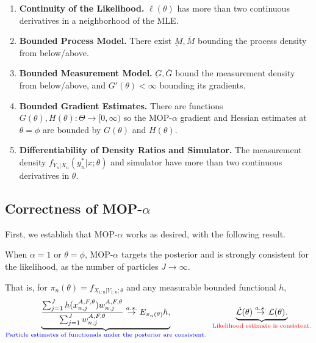 \documentclass{article}
\begin{document}
\begin{enumerate}[label=(A\arabic*)]
    \item \textbf{Continuity of the Likelihood.} $\ell(\theta)$ has more than two continuous derivatives in a neighborhood of the MLE.
    \label{assump:conti-lik}
    \item \textbf{Bounded Process Model.} There exist $\underbar{M}, \bar{M}$ bounding the process density from below/above.
    \label{assump:bounded-process}
    \item \textbf{Bounded Measurement Model.} $\underbar{G}, \bar{G}$ bound the measurement density from below/above, and $G'(\theta)<\infty$ bounding its gradients.
    \label{assump:bounded-measurement}
    \item \textbf{Bounded Gradient Estimates.} There are functions $G(\theta), H(\theta): \Theta \to [0,\infty)$ so the MOP-$\alpha$ gradient and Hessian estimates at $\theta=\phi$ are bounded by $G(\theta)$ and $H(\theta)$.
    \label{assump:local-bounded-derivative}
    \item \textbf{Differentiability of Density Ratios and Simulator.} The measurement density $f_{Y_n|X_n}(y_n^*|x; \theta)$ and simulator have more than two continuous derivatives in $\theta$.
    \label{assump:diff-meas-and-sim}
\end{enumerate}

\subsection{Correctness of MOP-$\alpha$}

First, we establish that MOP-$\alpha$ works as desired, with the following result.

\begin{thm}
    \label{thm:mop-targeting}
    When $\alpha=1$ or $\theta=\phi$, MOP-$\alpha$ targets the posterior and is strongly consistent for the likelihood, as the number of particles $J \to \infty$.
    
    That is, for $\pi_n(\theta)=f_{X_{1:n}|Y_{1:n} ; \theta}$ and any measurable bounded functional $h$, 
    \begin{equation}
        \underbrace{\frac{\sum_{j=1}^J h(x_{n,j}^{A,F, \theta}) w_{n,j}^{A,F,\theta}}{\sum_{j=1}^J w_{n,j}^{A,F,\theta}} \stackrel{a.s.}{\to} E_{\pi_n(\theta)} h,}_{\textcolor{blue}{\text{{Particle estimates of functionals under the posterior are consistent.}}}} \;\; \underbrace{\hat{\mathcal{L}}(\theta)  \stackrel{a.s.}{\to} \mathcal{L}(\theta).}_{\textcolor{red}{\text{{Likelihood estimate is consistent.}}}}
    \end{equation}
\end{thm}
\end{document}

